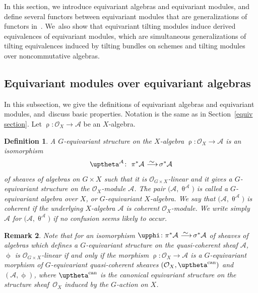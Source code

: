 \documentclass[10pt,a4paper]{amsart}
\newtheorem{dfn}{Definition}[section]
\newtheorem{rem}[dfn]{Remark}
\numberwithin{equation}{section}
\newcommand{\cA}{\mathcal{A}}
\newcommand{\cO}{\mathcal{O}}
\newcommand{\simto}{\,\,\,\,\raisebox{4pt}{$\sim$}{\kern -1.1em \longrightarrow}\,}
\begin{document}
In this section, we introduce equivariant algebras and equivariant modules, and define seve\-ral functors between equivariant modules that are generalizations of functors in~\cite[Section~2]{bfk}. We~also show that equivariant tilting modules induce derived equivalences of equivariant modules, which are simultaneous generalizations of tilting equivalences induced by tilting bundles on schemes and tilting modules over noncommutative algebras.

\subsection{Equivariant modules over equivariant algebras}

In this subsection, we give the definitions of equivariant algebras and equivariant modules, and~dis\-cuss basic properties.
Notation is the same as in Section~\ref{equiv section}. Let $\uprho\colon \cO_X\to \cA$ be an $X$-algebra.

\begin{dfn}
A {\it $G$-equivariant structure} on the $X$-algebra $\uprho\colon \cO_X\to\cA$ is an isomorphism
\begin{gather*}
\uptheta^{\cA}\colon\ \pi^*\cA\simto \sigma^*\cA
\end{gather*}
 of sheaves of algebras on $G\times X$
such that it is $\cO_{G\times X}$-linear and it gives a $G$-equivariant structure on the $\cO_X$-module $\cA$. The pair $\big(\cA,\uptheta^{\cA}\big)$ is called a {\it $G$-equivariant algebra over $X$}, or {\it $G$-equivariant $X$-algebra}. We say that $\big(\cA,\uptheta^{\cA}\big)$ is {\it coherent} if the underlying $X$-algebra $\cA$ is coherent $\cO_X$-module. We write simply $\cA$ for $\big(\cA,\uptheta^{\cA}\big)$ if no confusion seems likely to occur.
\end{dfn}

\begin{rem}\label{linearity}
Note that for an isomorphism $\upphi \colon \pi^*\cA\simto \sigma^*\cA$ of sheaves of algebras which defines a $G$-equivariant structure on the quasi-coherent sheaf $\cA$, $\upphi$ is $\cO_{G\times X}$-linear if and only if the morphism $\uprho\colon \cO_X\to \cA$ is a $G$-equivariant morphism of $G$-equivariant quasi-coherent sheaves $(\cO_X,\uptheta^{\rm can})$ and $(\cA,\upphi)$, where $\uptheta^{\rm can}$ is the canonical equivariant structure on the structure sheaf~$\cO_X$ induced by the $G$-action on $X$.
\end{rem}
\end{document}
